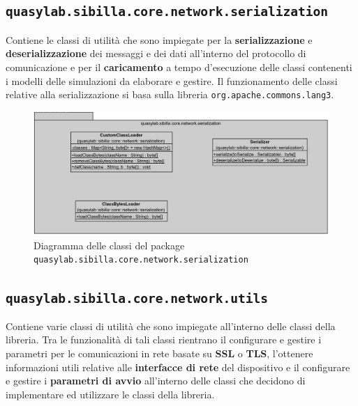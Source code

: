 \subsection{\texttt{quasylab.sibilla.core.network.serialization}} Contiene le classi di utilità che sono impiegate per la \textbf{serializzazione} e \textbf{deserializzazione} dei messaggi e dei dati all’interno del protocollo di comunicazione e per il \textbf{caricamento} a tempo d’esecuzione delle classi contenenti i modelli delle simulazioni da elaborare e gestire. Il funzionamento delle classi relative alla serializzazione si basa sulla libreria \texttt{org.apache.commons.lang3}.

\begin{figure}[H]
    \includegraphics[width=\linewidth]{images/quasylab.sibilla.core.network.serialization.png}
    \captionsetup{justification=centering}
    \caption{Diagramma delle classi del package \texttt{quasylab.sibilla.core.network.serialization}}
  \end{figure}

\subsection{\texttt{quasylab.sibilla.core.network.utils}} Contiene varie classi di utilità che sono impiegate all’interno delle classi della libreria. Tra le funzionalità di tali classi rientrano il configurare e gestire i parametri per le comunicazioni in rete basate su \textbf{SSL} o \textbf{TLS}, l’ottenere informazioni utili relative alle \textbf{interfacce di rete} del dispositivo e il configurare e gestire i \textbf{parametri di avvio} all’interno delle classi che decidono di implementare ed utilizzare le classi della libreria.

